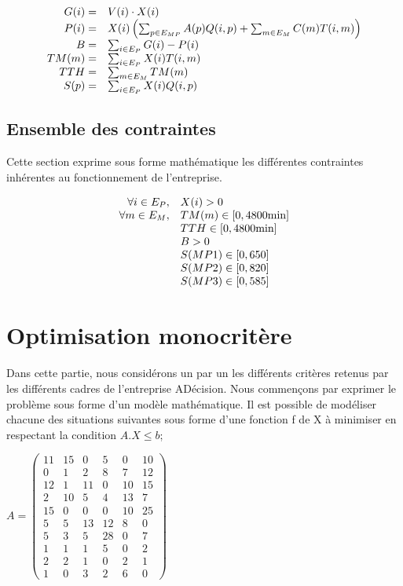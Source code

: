 \documentclass[a4paper, 11pt]{article}
\begin{document}
$$
\begin{array}{r l}
    G(i) =  & V(i)\cdot X(i) \\
    P(i) =  & X(i)\left(\sum_{p\in E_{MP}} A(p)Q(i, p)+ \sum_{m\in E_M} C(m)T(i, m)\right) \\
    B =     & \sum_{i\in E_P} G(i) - P(i) \\
    TM(m) = & \sum_{i\in E_P} X(i)T(i, m) \\
    TTH =   & \sum_{m\in E_M} TM(m) \\
    S(p) =  & \sum_{i\in E_P} X(i)Q(i, p) \\
\end{array}
$$

\subsection{Ensemble des contraintes}
Cette section exprime sous forme mathématique les différentes contraintes
inhérentes au fonctionnement de l'entreprise.

$$
\begin{array}{r l}
    \forall i\in E_P, & X(i) > 0 \\
    \forall m\in E_M, & TM(m) \in [0, 4800\mbox{min}] \\
                      & TTH \in [0, 4800\mbox{min}] \\
                      & B > 0 \\
                      & S(MP1) \in [0, 650] \\
                      & S(MP2) \in [0, 820] \\
                      & S(MP3) \in [0, 585] \\
\end{array}
$$

\section{Optimisation monocritère}
Dans cette partie, nous considérons un par un les différents critères retenus
par les différents cadres de l’entreprise ADécision. Nous commençons par
exprimer le problème sous forme d’un modèle mathématique. Il est possible de
modéliser chacune des situations suivantes sous forme d’une fonction f de X à
minimiser en respectant la condition $A . X \leq b$;

$A = \begin{pmatrix}
11&15&0&5&0&10 \\
0&1&2&8&7&12\\
12&1&11&0&10&15\\
2&10&5&4&13&7\\
15&0&0&0&10&25\\
5&5&13&12&8&0\\
5&3&5&28&0&7\\
1&1&1&5&0&2\\
2&2&1&0&2&1\\
1&0&3&2&6&0
\end{pmatrix}$\\
\end{document}
